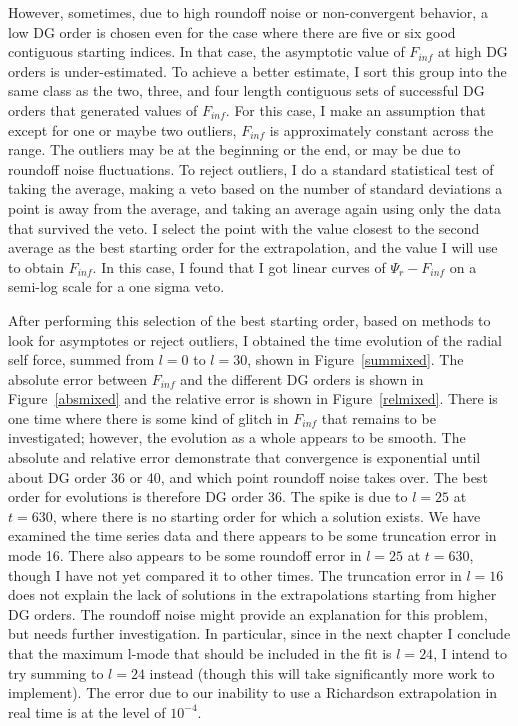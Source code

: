 However, sometimes, due to high roundoff noise or non-convergent behavior, a low DG order is chosen even for the case where there are five or six good contiguous starting indices. In that case, the asymptotic value of $F_{inf}$ at high DG orders is under-estimated. To achieve a better estimate, I sort this group into the same class as the two, three, and four length contiguous sets of successful DG orders that generated values of $F_{inf}$. For this case, I make an assumption that except for one or maybe two outliers, $F_{inf}$ is approximately constant across the range. The outliers may be at the beginning or the end, or may be due to roundoff noise fluctuations. To reject outliers, I do a standard statistical test of taking the average, making a veto based on the number of standard deviations a point is away from the average, and taking an average again using only the data that survived the veto. I select the point with the value closest to the second average as the best starting order for the extrapolation, and the value I will use to obtain $F_{inf}$. In this case, I found that I got linear curves of $\Psi_r-F_{inf}$ on a semi-log scale for a one sigma veto.

After performing this selection of the best starting order, based on methods to look for asymptotes or reject outliers, I obtained the time evolution of the radial self force, summed from $l=0$ to $l=30$, shown in Figure~\ref{summixed}. The absolute error between $F_{inf}$ and the different DG orders is shown in Figure~\ref{absmixed} and the relative error is shown in Figure~\ref{relmixed}. There is one time where there is some kind of glitch in $F_{inf}$ that remains to be investigated; however, the evolution as a whole appears to be smooth. The absolute and relative error demonstrate that convergence is exponential until about DG order 36 or 40, and which point roundoff noise takes over. The best order for evolutions is therefore DG order 36. The spike is due to $l=25$ at $t=630$, where there is no starting order for which a solution exists. We have examined the time series data and there appears to be some truncation error in mode 16. There also appears to be some roundoff error in $l=25$ at $t=630$, though I have not yet compared it to other times. The truncation error in $l=16$ does not explain the lack of solutions in the extrapolations starting from higher DG orders. The roundoff noise might provide an explanation for this problem, but needs further investigation. In particular, since in the next chapter I conclude that the maximum l-mode that should be included in the fit is $l=24$, I intend to try summing to $l=24$ instead (though this will take significantly more work to implement). The error due to our inability to use a Richardson extrapolation in real time is at the level of $10^{-4}$.

